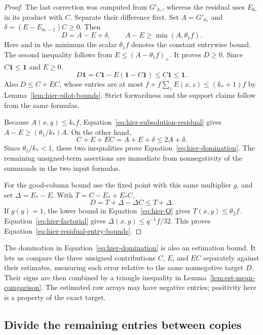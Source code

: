 \begin{proof}
The last correction was computed from $G'_{k_*}$, whereas the residual uses $E_{k_*}$ in its product with $C$. Separate their difference first. Set $A=G'_{k_*}$ and
$\delta=(E-E_{k_*-1})C\geq0$.  Then
\begin{equation}
 D=A-E+\delta,
 \qquad A-E\geq\min(A,\theta_1f).
 \label{eq:hier-subsolution-residual}
\end{equation}
Here and in the minimum the scalar $\theta_1f$ denotes the constant
entrywise bound.  The second inequality follows from
$E\leq(A-\theta_1f)_+$.  It proves $D\geq0$.
Since $C\mathbf 1\leq\mathbf 1$ and $E\geq0$,
\[
 D\mathbf 1=C\mathbf 1-E(\mathbf 1-C\mathbf 1)
       \leq C\mathbf 1\leq\mathbf 1.
\]
Also $D\leq C+EC$, whose entries are at most
$f+f\sum_z E(x,z)\leq(k_*+1)f$ by
Lemma~\ref{lem:hier-pilot-bounds}.  Strict forwardness and the support
claims follow from the same formulas.

Because $A(x,y)\leq k_*f$, Equation~\eqref{eq:hier-subsolution-residual}
gives $A-E\geq(\theta_1/k_*)A$.  On the other hand,
\[
 C+E+EC=A+E+\delta\leq2A+\delta.
\]
Since $\theta_1/k_*<1$, these two inequalities prove
Equation~\eqref{eq:hier-domination}.  The remaining unsigned-term
assertions are immediate from nonnegativity of the summands in the two
input formulas.

For the good-column bound use the fixed point with this same multiplier
$g$, and set $\Delta=E_*-E$.  With $T=C-E_*+E_*C$,
\[
 D=T+\Delta-\Delta C\leq T+\Delta.
\]
If $g(y)=1$, the lower bound in Equation~\eqref{eq:hier-Q} gives
$T(x,y)\leq\theta_2f$.  Equation~\eqref{eq:hier-factorial} gives
$\Delta(x,y)\leq q^{-1}f/32$.  This proves
Equation~\eqref{eq:hier-residual-entry-bounds}.
\end{proof}

The domination in Equation~\eqref{eq:hier-domination} is also an
estimation bound.  It lets us compare the three unsigned contributions
$C$, $E$, and $EC$ separately against their estimates, measuring each
error relative to the same nonnegative target $D$.  Their signs are
then combined by a triangle inequality in
Lemma~\ref{lem:est-mean-comparison}.  The estimated raw arrays may have
negative entries; positivity here is a property of the exact target.

\subsection{Divide the remaining entries between copies}

